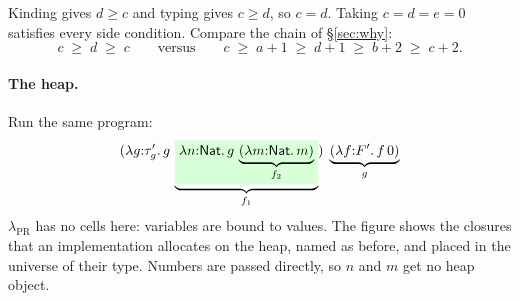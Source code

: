 \documentclass[11pt]{article}
\newcommand{\Nat}{\mathsf{Nat}}
\newcommand{\lam}[2]{\lambda #1{:}#2.\,}
\begin{document}
Kinding gives $d \geq c$ and typing gives $c \geq d$, so $c = d$. Taking
$c = d = e = 0$ satisfies every side condition. Compare the chain of
\S\ref{sec:why}:
\[
  c \;\geq\; d \;\geq\; c
  \qquad\text{versus}\qquad
  c \;\geq\; a + 1 \;\geq\; d + 1 \;\geq\; b + 2 \;\geq\; c + 2.
\]

\newpage
\paragraph{The heap.}
Run the same program:
\[
  (\lam{g}{\tau_g'} g\,
    \underbrace{\colorbox{green!15}{$\displaystyle
      \lam{n}{\Nat} g\,\underbrace{(\lam{m}{\Nat} m)}_{f_2}$}}_{f_1})\;
  \underbrace{(\lam{f}{F'} f\,0)}_{g}
\]
$\lambda_{\mathrm{PR}}$ has no cells here: variables are bound to values. The
figure shows the closures that an implementation allocates on the heap,
named as before, and placed in the universe of their type. Numbers are passed
directly, so $n$ and $m$ get no heap object.
\end{document}

